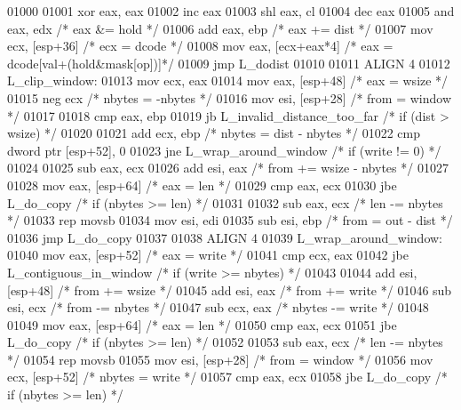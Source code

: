 \begin{DoxyCode}
{{{{{{{{{{{{{{{{{{{{{{{{{{{{{{{{{{{{{{{{{{{{{{{{{{{{{{{{{{{{{{{{{{{{{{{{{{{{{{{{{{{{{{{{{{{{{{{{{{{{{{{{{{{{{{{{{{{{{{{{{{{{{{{{{{{{{{{{{{{{{{{{{{{{{{{{{{{{{{{{{{{{{{{{{{{{{{{{{{{{{{{{{{{{{{{{{{{{{{{{{{{{{{{{{{{{{{{{{{{{{{{{{{{{{{{{{{{{{{{{{{{{{{{{{{{{{{{{{{{{{{{{{{{{{{{{{{{{{{{{{{{{{{{{{{{{{{{{{{{{{{{{{{{{{{{{{{{{{{{{{{{{{{{{{{{{{{{{{{{{{{{{{{{{{{{{{{{{{{{{{{{{{{{01000 
01001     xor eax, eax
01002     inc eax
01003     shl eax, cl
01004     dec eax
01005     and eax, edx         \textcolor{comment}{/* eax &= hold */}
01006     add eax, ebp         \textcolor{comment}{/* eax += dist */}
01007     mov ecx, [esp+36]     \textcolor{comment}{/* ecx = dcode */}
01008     mov eax, [ecx+eax*4] \textcolor{comment}{/* eax = dcode[val+(hold&mask[op])]*/}
01009     jmp L\_dodist
01010 
01011 ALIGN 4
01012 L\_clip\_window:
01013     mov ecx, eax
01014     mov eax, [esp+48]     \textcolor{comment}{/* eax = wsize */}
01015     neg ecx                \textcolor{comment}{/* nbytes = -nbytes */}
01016     mov esi, [esp+28]     \textcolor{comment}{/* from = window */}
01017 
01018     cmp eax, ebp
01019     jb  L\_invalid\_distance\_too\_far \textcolor{comment}{/* if (dist > wsize) */}
01020 
01021     add ecx, ebp         \textcolor{comment}{/* nbytes = dist - nbytes */}
01022     cmp dword ptr [esp+52], 0
01023     jne L\_wrap\_around\_window \textcolor{comment}{/* if (write != 0) */}
01024 
01025     sub eax, ecx
01026     add esi, eax         \textcolor{comment}{/* from += wsize - nbytes */}
01027 
01028     mov eax, [esp+64]    \textcolor{comment}{/* eax = len */}
01029     cmp eax, ecx
01030     jbe L\_do\_copy          \textcolor{comment}{/* if (nbytes >= len) */}
01031 
01032     sub eax, ecx         \textcolor{comment}{/* len -= nbytes */}
01033     rep     movsb
01034     mov esi, edi
01035     sub esi, ebp         \textcolor{comment}{/* from = out - dist */}
01036     jmp L\_do\_copy
01037 
01038 ALIGN 4
01039 L\_wrap\_around\_window:
01040     mov eax, [esp+52]    \textcolor{comment}{/* eax = write */}
01041     cmp ecx, eax
01042     jbe L\_contiguous\_in\_window \textcolor{comment}{/* if (write >= nbytes) */}
01043 
01044     add esi, [esp+48]    \textcolor{comment}{/* from += wsize */}
01045     add esi, eax         \textcolor{comment}{/* from += write */}
01046     sub esi, ecx         \textcolor{comment}{/* from -= nbytes */}
01047     sub ecx, eax         \textcolor{comment}{/* nbytes -= write */}
01048 
01049     mov eax, [esp+64]    \textcolor{comment}{/* eax = len */}
01050     cmp eax, ecx
01051     jbe L\_do\_copy          \textcolor{comment}{/* if (nbytes >= len) */}
01052 
01053     sub eax, ecx         \textcolor{comment}{/* len -= nbytes */}
01054     rep     movsb
01055     mov esi, [esp+28]     \textcolor{comment}{/* from = window */}
01056     mov ecx, [esp+52]     \textcolor{comment}{/* nbytes = write */}
01057     cmp eax, ecx
01058     jbe L\_do\_copy          \textcolor{comment}{/* if (nbytes >= len) */}
}}}}}}}}}}}}}}}}}}}}}}}}}}}}}}}}}}}}}}}}}}}}}}}}}}}}}}}}}}}}}}}}}}}}}}}}}}}}}}}}}}}}}}}}}}}}}}}}}}}}}}}}}}}}}}}}}}}}}}}}}}}}}}}}}}}}}}}}}}}}}}}}}}}}}}}}}}}}}}}}}}}}}}}}}}}}}}}}}}}}}}}}}}}}}}}}}}}}}}}}}}}}}}}}}}}}}}}}}}}}}}}}}}}}}}}}}}}}}}}}}}}}}}}}}}}}}}}}}}}}}}}}}}}}}}}}}}}}}}}}}}}}}}}}}}}}}}}}}}}}}}}}}}}}}}}}}}}}}}}}}}}}}}}}}}}}}}}}}}}}}}}}}}}}}}}}}}}}}}}}}}}}}}}
\end{DoxyCode}
